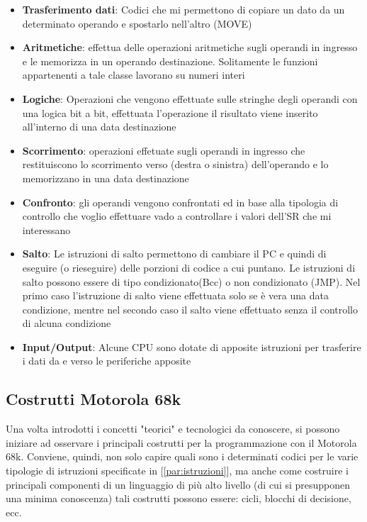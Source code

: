 \begin{itemize}
    \item \textbf{Trasferimento dati}: Codici che mi permettono di copiare un dato da un determinato operando e spostarlo nell'altro (MOVE)
    
    \item \textbf{Aritmetiche}: effettua delle operazioni aritmetiche sugli operandi in ingresso e le memorizza in un operando destinazione. Solitamente le funzioni appartenenti a tale classe lavorano su numeri interi

    \item \textbf{Logiche}: Operazioni che vengono effettuate sulle stringhe degli operandi con una logica bit a bit, effettuata l'operazione il risultato viene inserito all'interno di una data destinazione

    \item \textbf{Scorrimento}: operazioni effetuate sugli operandi in ingresso che restituiscono lo scorrimento verso (destra o sinistra) dell'operando e lo memorizzano in una data destinazione

    \item \textbf{Confronto}: gli operandi vengono confrontati ed in base alla tipologia di controllo che voglio effettuare vado a controllare i valori dell'SR che mi interessano

    \item \textbf{Salto}: Le istruzioni di salto permettono di cambiare il PC e quindi di eseguire (o rieseguire) delle porzioni di codice a cui puntano. Le istruzioni di salto possono essere di tipo condizionato(Bcc) o non condizionato (JMP). Nel primo caso l'istruzione di salto viene effettuata solo se è vera una data condizione, mentre nel secondo caso il salto viene effettuato senza il controllo di alcuna condizione

    \item \textbf{Input/Output}: Alcune CPU sono dotate di apposite istruzioni per trasferire i dati da e verso le periferiche apposite
\end{itemize}

\subsection{Costrutti Motorola 68k}
Una volta introdotti i concetti "teorici" e tecnologici da conoscere, si possono iniziare ad osservare i principali costrutti per la programmazione con il Motorola 68k.
Conviene, quindi, non solo capire quali sono i determinati codici per le varie tipologie di istruzioni specificate in [\ref{par:istruzioni}], ma anche come costruire i principali componenti di un linguaggio di più alto livello (di cui si presupponen una minima conoscenza) tali costrutti possono essere: cicli, blocchi di decisione, ecc.
